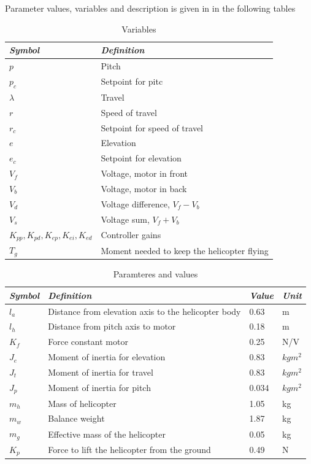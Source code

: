 \documentclass[a4paper, 12pt]{article}\usepackage[utf8]{inputenc}
\begin{document}
Parameter values, variables and description is given in in the following tables
\begin{table}[h]
    \centering
    \caption{Variables}
    \label{tab:symbol}
    \begin{tabular}{ll}
        \hline
        \textit{Symbol}&\textit{Definition}\\
        \hline
        $p$ & Pitch\\
        $p_c$ & Setpoint for pitc\\
        $\lambda$ & Travel\\
        $r$ & Speed of travel\\
        $r_c$ & Setpoint for speed of travel\\
        $e$ & Elevation\\
        $e_c$ & Setpoint for elevation\\
        $V_f$ & Voltage, motor in front\\
        $V_b$ & Voltage, motor in back\\
        $V_d$ & Voltage difference, $V_f-V_b$\\
        $V_s$ & Voltage sum, $V_f+V_b$\\
        $K_{pp}, K_{pd}, K_{ep}, K_{ei}, K_{ed}$ & Controller gains\\
        $T_g$ & Moment needed to keep the helicopter flying\\ 
        \hline
    \end{tabular}
\end{table}

\begin{table}[h]
    \centering
    \caption{Paramteres and values}
    \label{tab:symbol}
    \begin{tabular}{llll}
        \hline
        \textit{Symbol}&\textit{Definition}&\textit{Value}&\textit{Unit}\\
        \hline
        $l_a$ & Distance from elevation axis to the helicopter body & 0.63 & m\\
        $l_h$ & Distance from pitch axis to motor & 0.18 & m\\
        $K_f$ & Force constant motor & 0.25 & N/V\\
        $J_e$ & Moment of inertia for elevation & $0.83$ & $kg m^2$\\
        $J_t$ & Moment of inertia for travel & $0.83$ & $kg m^2$\\
        $J_p$ & Moment of inertia for pitch & $0.034$ & $kg m^2$\\
        $m_h$ & Mass of helicopter & 1.05 & kg\\
        $m_w$ & Balance weight & 1.87 & kg\\
        $m_g$ & Effective mass of the helicopter & 0.05 & kg\\
        $K_p$ & Force to lift the helicopter from the ground & 0.49 & N\\
        \hline
    \end{tabular}
\end{table}
\end{document}
